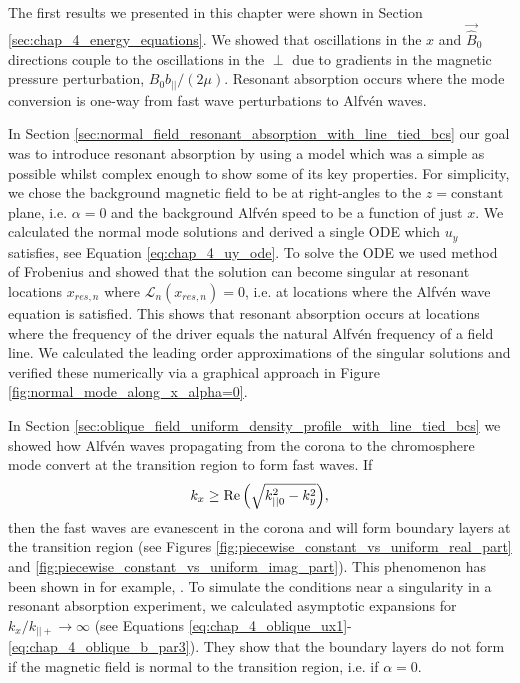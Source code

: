 The first results we presented in this chapter were shown in Section \ref{sec:chap_4_energy_equations}. We showed that oscillations in the $x$ and $\vec{\hat{B}}_0$ directions couple to the oscillations in the $\perp$ due to gradients in the magnetic pressure perturbation, $B_0b_{||}/(2\mu)$. Resonant absorption occurs where the mode conversion is one-way from fast wave perturbations to Alfv\'en waves. 

In Section \ref{sec:normal_field_resonant_absorption_with_line_tied_bcs} our goal was to introduce resonant absorption by using a model which was a simple as possible whilst complex enough to show some of its key properties. For simplicity, we chose the background magnetic field to be at right-angles to the $z=\text{constant}$ plane, i.e. $\alpha=0$ and the background Alfv\'en speed to be a function of just $x$. We calculated the normal mode solutions and derived a single ODE which $u_y$ satisfies, see Equation \eqref{eq:chap_4_uy_ode}. To solve the ODE we used method of Frobenius and showed that the solution can become singular at resonant locations $x_{res,n}$ where $\mathcal{L}_n(x_{res,n})=0$, i.e. at locations where the Alfv\'en wave equation is satisfied. This shows that resonant absorption occurs at locations where the frequency of the driver equals the natural Alfv\'en frequency of a field line. We calculated the leading order approximations of the singular solutions and verified these numerically via a graphical approach in Figure \ref{fig:normal_mode_along_x_alpha=0}.

In Section \ref{sec:oblique_field_uniform_density_profile_with_line_tied_bcs} we showed how Alfv\'en waves propagating from the corona to the chromosphere mode convert at the transition region to form fast waves. If
\[k_x \ge \Re\qty(\sqrt{k_{||0}^2 - k_y^2}),\]
then the fast waves are evanescent in the corona and will form boundary layers at the transition region (see Figures \ref{fig:piecewise_constant_vs_uniform_real_part} and \ref{fig:piecewise_constant_vs_uniform_imag_part}). This phenomenon has been shown in for example, \citet{Halberstadt1993,Halberstadt1995,Arregui2003}. 
To simulate the conditions near a singularity in a resonant absorption experiment, we calculated asymptotic expansions for $k_x / k_{||+} \rightarrow \infty$ (see Equations \ref{eq:chap_4_oblique_ux1}-\ref{eq:chap_4_oblique_b_par3}). They show that the boundary layers do not form if the magnetic field is normal to the transition region, i.e. if $\alpha=0$.

